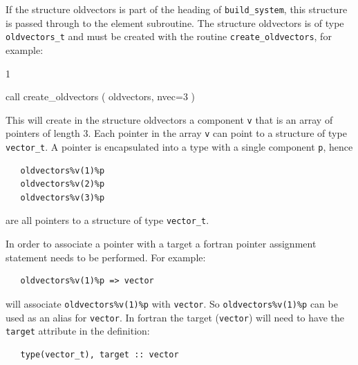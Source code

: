 If the structure oldvectors is part of the heading of \texttt{build\_system},
this structure is passed through to the element subroutine. The structure
oldvectors is of type \texttt{oldvectors\_t} and must be created with 
the routine \texttt{create\_oldvectors}, for example:
\begin{listing}{1}
   
   call create_oldvectors ( oldvectors, nvec=3 )

\end{listing}
This will 
create in the structure oldvectors a component \texttt{v} that
is an array of pointers of length 3. 
Each pointer in the array \texttt{v} can point to a structure of 
type \texttt{vector\_t}. A pointer is encapsulated into a type with a
single component \texttt{p}, hence
\begin{verbatim}
   oldvectors%v(1)%p
   oldvectors%v(2)%p
   oldvectors%v(3)%p
\end{verbatim}
are all pointers to a structure of type \texttt{vector\_t}.

In order to associate a pointer with a target a fortran pointer assignment
statement needs to be performed. For example:
\begin{verbatim}
   oldvectors%v(1)%p => vector
\end{verbatim}
will associate \texttt{oldvectors\%v(1)\%p} with \texttt{vector}. So 
\texttt{oldvectors\%v(1)\%p} can be used as an alias for \texttt{vector}.
In fortran the target (\texttt{vector}) will need to have the \texttt{target}
attribute in the definition:
\begin{verbatim}
   type(vector_t), target :: vector
\end{verbatim}

